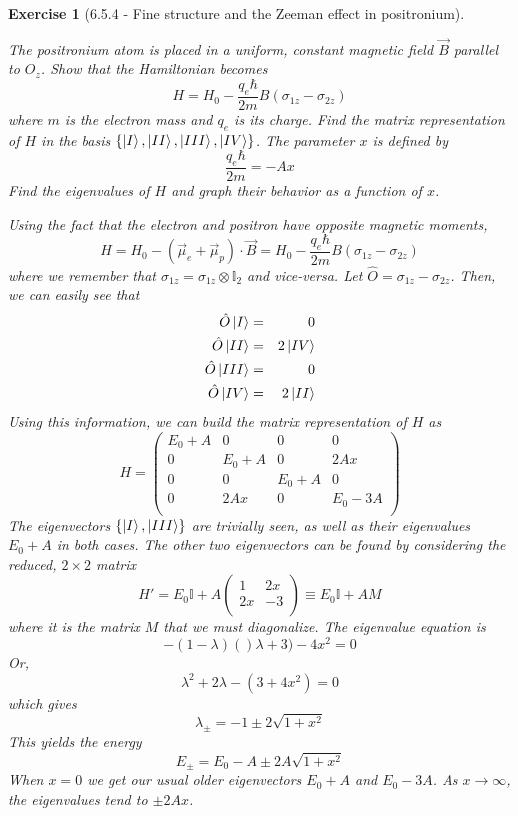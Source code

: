 \documentclass[12pt]{article}
\def\be{\begin{equation}}
\def\ee{\end{equation}}
\def\bea{\begin{eqnarray*}}
\def\eea{\end{eqnarray*}}
\def\f{\frac}
\newtheorem{exercise}{Exercise}
\begin{document}
\begin{exercise}[6.5.4 - Fine structure and the Zeeman effect in positronium]
\begin{exercises}
			\item The positronium atom is placed in a uniform, constant magnetic field $\vec{B}$ parallel to $O_z$. Show that the Hamiltonian becomes
			\be
				H = H_0 - \f{q_e\hbar}{2m}B(\sigma_{1z} - \sigma_{2z})
			\ee
			where $m$ is the electron mass and $q_e$ is its charge. Find the matrix representation of $H$ in the basis $\{ \ket{I}, \ket{II}, \ket{III}, \ket{IV} \}$. The parameter $x$ is defined by
			\be
				\f{q_e\hbar}{2m} = -Ax
			\ee
			Find the eigenvalues of $H$ and graph their behavior as a function of $x$.
			\begin{multianswer}[true]
				Using the fact that the electron and positron have opposite magnetic moments,
				\be
					H = H_0 - (\vec{\mu}_e + \vec{\mu}_p)\cdot\vec{B} =  H_0 - \f{q_e\hbar}{2m}B(\sigma_{1z} - \sigma_{2z})
				\ee 
				where we remember that $\sigma_{1z}=\sigma_{1z}\otimes\mathbb{I}_2$ and vice-versa. Let $\hat{O}=\sigma_{1z} - \sigma_{2z}$. Then, we can easily see that
				\bea
					\hat{O}\ket{I} &=& 0 \\
					\hat{O}\ket{II} &=& 2\ket{IV} \\
					\hat{O}\ket{III} &=& 0 \\
					\hat{O}\ket{IV} &=& 2\ket{II}
				\eea
				Using this information, we can build the matrix representation of $H$ as
				\be
					H = 
					\begin{pmatrix}
						E_0 + A & 0 & 0 & 0 \\
						0 & E_0 + A & 0 & 2Ax \\
						0 & 0 & E_0 + A & 0 \\
						0 & 2Ax & 0 & E_0-3A \\
					\end{pmatrix}
				\ee
				The eigenvectors $\{ \ket{I}, \ket{III} \}$ are trivially seen, as well as their eigenvalues $E_0+A$ in both cases. The other two eigenvectors can be found by considering the reduced, $2\times2$ matrix
				\be
					H' = E_0\mathbb{I} + A
					\begin{pmatrix}
						1 & 2x \\
						2x & -3 \\
					\end{pmatrix} \equiv E_0\mathbb{I} + AM
				\ee
				where it is the matrix $M$ that we must diagonalize. The eigenvalue equation is
				\be
					-(1-\lambda)()\lambda+3) - 4x^2 = 0
				\ee
				Or,
				\be
					\lambda^2 + 2\lambda - (3+4x^2) = 0
				\ee
				which gives
				\be
					\lambda_\pm = -1\pm 2\sqrt{1 + x^2}
				\ee
				This yields the energy
				\be
					E_\pm = E_0 -A \pm 2A\sqrt{1 + x^2}
				\ee
				When $x=0$ we get our usual older eigenvectors $E_0+A$ and $E_0-3A$. As $x\to\infty$, the eigenvalues tend to $\pm 2Ax$. 
			\end{multianswer}
	\end{exercises}
	\end{exercise}
	
\end{document}
